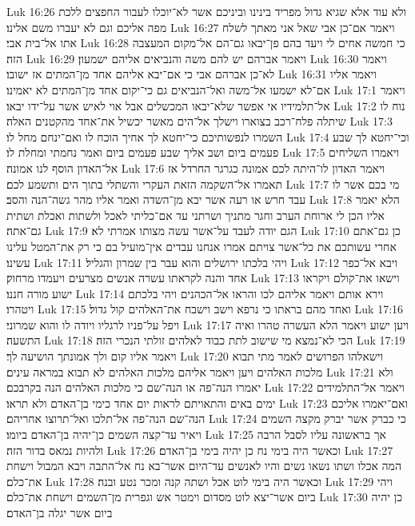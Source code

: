 Luk 16:26  ולא עוד אלא שגיא גדול מפריד בינינו וביניכם אשר לא־יוכלו לעבור החפצים ללכת מפה אליכם וגם לא יעברו משם אלינו׃
Luk 16:27  ויאמר אם־כן אבי שאל אני מאתך לשלח אתו אל־בית אבי׃
Luk 16:28  כי חמשה אחים לי ויעד בהם פן־יבאו גם־הם אל־מקום המעצבה הזה׃
Luk 16:29  ויאמר אברהם יש להם משה והנביאים אליהם ישמעון׃
Luk 16:30  ויאמר לא־כן אברהם אבי כי אם־יבא אליהם אחד מן־המתים אז ישובו׃
Luk 16:31  ויאמר אליו אם־לא ישמעו אל־משה ואל־הנביאים גם כי־יקום אחד מן־המתים לא יאמינו׃
Luk 17:1  ויאמר אל־תלמידיו אי אפשר שלא־יבאו המכשלים אבל אוי לאיש אשר על־ידו יבאו׃
Luk 17:2  נוח לו שיתלה פלח־רכב בצוארו וישלך אל־הים מאשר יכשיל את־אחד מהקטנים האלה׃
Luk 17:3  השמרו לנפשותיכם כי־יחטא לך אחיך הוכח לו ואם־ינחם מחל לו׃
Luk 17:4  וכי־יחטא לך שבע פעמים ביום ושב אליך שבע פעמים ביום ואמר נחמתי ומחלת לו׃
Luk 17:5  ויאמרו השליחים אל־האדון הוסף לנו אמונה׃
Luk 17:6  ויאמר האדון לו־היתה לכם אמונה כגרגר החרדל אז תאמרו אל־השקמה הזאת העקרי והשתלי בתוך הים ותשמע לכם׃
Luk 17:7  מי בכם אשר לו עבד חרש או רעה אשר יבא מן־השדה ואמר אליו מהר גשה־הנה והסב׃
Luk 17:8  הלא יאמר אליו הכן לי ארוחת הערב וחגר מתניך ושרתני עד אם־כליתי לאכל ולשתות ואכלת ושתית גם־אתה׃
Luk 17:9  הגם יודה לעבד על־אשר עשה מצותו אמרתי לא׃
Luk 17:10  כן גם־אתם אחרי עשותכם את כל־אשר צויתם אמרו אנחנו עבדים אין־מועיל בם כי רק את־המטל עלינו עשינו׃
Luk 17:11  ויהי בלכתו ירושלים והוא עבר בין שמרון והגליל׃
Luk 17:12  ויבא אל־כפר אחד והנה לקראתו עשרה אנשים מצרעים ויעמדו מרחוק׃
Luk 17:13  וישאו את־קולם ויקראו ישוע מורה חננו׃
Luk 17:14  וירא אותם ויאמר אליהם לכו והראו אל־הכהנים ויהי בלכתם ויטהרו׃
Luk 17:15  ואחד מהם בראתו כי נרפא וישב וישבח את־האלהים קול גדול׃
Luk 17:16  ויפל על־פניו לרגליו ויודה לו והוא שמרוני׃
Luk 17:17  ויען ישוע ויאמר הלא העשרה טהרו ואיה התשעה׃
Luk 17:18  הכי לא־נמצא מי שישוב לתת כבוד לאלהים זולתי הנכרי הזה׃
Luk 17:19  ויאמר אליו קום ולך אמונתך הושיעה לך׃
Luk 17:20  וישאלהו הפרושים לאמר מתי תבוא מלכות האלהים ויען ויאמר אליהם מלכות האלהים לא תבוא במראה עינים׃
Luk 17:21  ולא יאמרו הנה־פה או הנה־שם כי מלכות האלהים הנה בקרבכם׃
Luk 17:22  ויאמר אל־התלמידים ימים באים והתאויתם לראות יום אחד כימי בן־האדם ולא תראו׃
Luk 17:23  ואם־יאמרו אליכם הנה־שם הנה־פה אל־תלכו ואל־תרוצו אחריהם׃
Luk 17:24  כי כברק אשר יברק מקצה השמים ויאיר עד־קצה השמים כן־יהיה בן־האדם ביומו׃
Luk 17:25  אך בראשונה עליו לסבל הרבה ולהיות נמאס בדור הזה׃
Luk 17:26  וכאשר היה בימי נח כן יהיה בימי בן־האדם׃
Luk 17:27  המה אכלו ושתו נשאו נשים והיו לאנשים עד־היום אשר־בא נח אל־התבה ויבא המבול וישחת את־כלם׃
Luk 17:28  וכאשר היה בימי לוט אכל ושתה קנה ומכר נטע ובנה׃
Luk 17:29  ויהי ביום אשר־יצא לוט מסדום וימטר אש וגפרית מן־השמים וישחת את־כלם׃
Luk 17:30  כן יהיה ביום אשר יגלה בן־האדם׃
